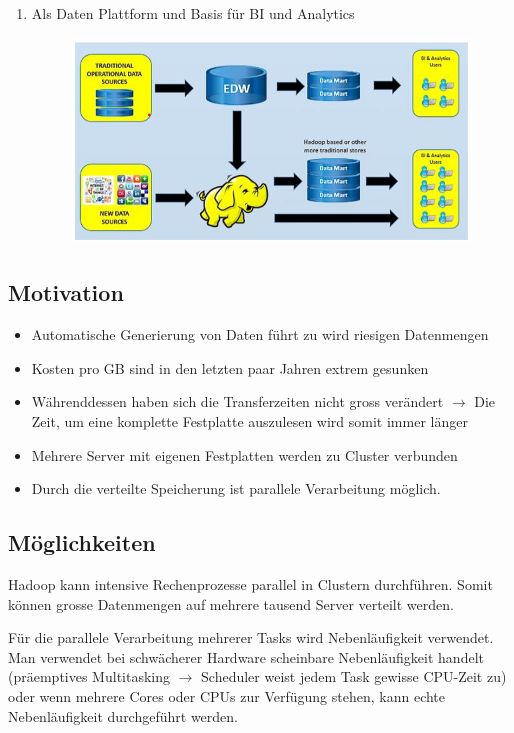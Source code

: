 \documentclass[a4paper, 11pt, nofootinbib]{article}
\begin{document}
\begin{enumerate}
	\item Als Daten Plattform und Basis für BI und Analytics
	\begin{figure}[htb!]
		\centering
		\includegraphics[keepaspectratio=true,height=9\baselineskip]{datei_plattform_2.PNG}
	\end{figure}
\end{enumerate}

\newpage

\subsection{Motivation}
\begin{itemize}
	\item Automatische Generierung von Daten führt zu wird riesigen Datenmengen
	\item Kosten pro GB sind in den letzten paar Jahren extrem gesunken
	\item Währenddessen haben sich die Transferzeiten nicht gross verändert
		\subitem $\rightarrow$ Die Zeit, um eine komplette Festplatte auszulesen wird somit immer länger
	\item Mehrere Server mit eigenen Festplatten werden zu Cluster verbunden
	\item Durch die verteilte Speicherung ist parallele Verarbeitung möglich.
\end{itemize}

\subsection{Möglichkeiten}
Hadoop kann intensive Rechenprozesse parallel in Clustern durchführen. Somit können grosse Datenmengen auf mehrere tausend Server verteilt werden.

Für die parallele Verarbeitung mehrerer Tasks wird Nebenläufigkeit verwendet. Man verwendet bei schwächerer Hardware scheinbare Nebenläufigkeit handelt (präemptives Multitasking $\rightarrow$ Scheduler weist jedem Task gewisse CPU-Zeit zu) oder wenn mehrere Cores oder CPUs zur Verfügung stehen, kann echte Nebenläufigkeit durchgeführt werden.
\end{document}
